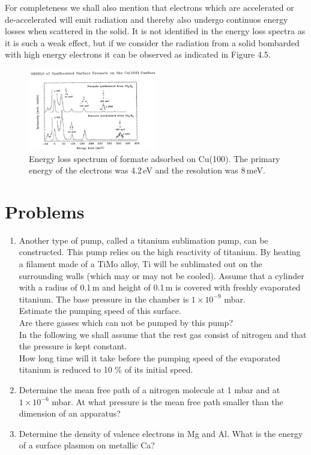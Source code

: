 For completeness we shall also mention that electrons which are accelerated or de-accelerated will emit radiation \cite{Feynman} and thereby also undergo continuos energy losses when scattered in the solid. It is not identified in the energy loss spectra as it is such a weak effect, but if we consider the radiation from a solid bombarded with high energy electrons it can be observed as indicated in Figure 4.5.

\begin{figure}[htbp]
\centering
\includegraphics[width=0.5\textwidth]{figures/02_13}
\caption{Energy loss spectrum of formate adsorbed on Cu(100). The primary energy of the electrons was 4.2\,eV and the resolution was 8\,meV.}
\label{fig:formate_spectrum}
\end{figure}

\section{Problems}
\begin{enumerate}
\item Another type of pump, called a titanium sublimation pump, can be constructed. This pump relies on the high reactivity of titanium. By heating a filament made of a TiMo alloy, Ti will be sublimated out on the surrounding walls (which may or may not be cooled). Assume that a cylinder with a radius of 0.1\,m and height of 0.1\,m is covered with freshly evaporated titanium. The base pressure in the chamber is $1 \times 10^{-9}$ mbar.\\

Estimate the pumping speed of this surface.\\

Are there gasses which can not be pumped by this pump?\\

In the following we shall assume that the rest gas consist of nitrogen and that the pressure is kept constant.\\

How long time will it take before the pumping speed of the evaporated titanium is reduced to 10 \% of its initial speed.\\

\item Determine the mean free path of a nitrogen molecule at 1 mbar and at $1 \times 10^{-6}$ mbar. At what pressure is the mean free path smaller than the dimension of an apparatus?

\item Determine the density of valence electrons in Mg and Al. What is the energy of a surface plasmon on metallic Ca?
\end{enumerate}

